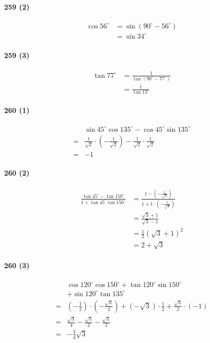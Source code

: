\documentclass[fleqn,a4j,dvipdfmx,uplatex,twocolumn]{jsarticle}
\begin{document}
\paragraph{259 (2)}
\begin{align*}
\cos 56^{\circ} & =\sin \left(90^{\circ}-56^{\circ}\right) \\
& =\sin 34^{\circ}
\end{align*}

\paragraph{259 (3)}
\begin{align*}
\tan 77^{\circ} & =\frac{1}{\tan \left(90^{\circ}-77^{\circ}\right)} \\
& =\frac{1}{\tan 13^{\circ}}
\end{align*}

\paragraph{260 (1)}
\begin{align*}
& \sin 45^{\circ} \cos 135^{\circ}-\cos 45^{\circ} \sin 135^{\circ} \\
= & \frac{1}{\sqrt{2}} \cdot\left(-\frac{1}{\sqrt{2}}\right)-\frac{1}{\sqrt{2}} \cdot \frac{1}{\sqrt{2}} \\
= & -1
\end{align*}

\paragraph{260 (2)}
\begin{align*}
\frac{\tan 45^{\circ}-\tan 150^{\circ}}{1+\tan 45^{\circ} \tan 150^{\circ}}
& =\frac{1-\left(-\frac{1}{\sqrt{3}}\right)}{1+1 \cdot\left(-\frac{1}{\sqrt{3}}\right)} \\
& =\frac{\sqrt{3}+1}{\sqrt{3}-1} \\
& =\frac{1}{2}(\sqrt{3}+1)^2 \\
& =2+\sqrt{3}
\end{align*}

\paragraph{260 (3)}
\begin{align*}
& \cos 120^{\circ} \cos 150^{\circ}+\tan 120^{\circ} \sin 150^{\circ} \\
& +\sin 120^{\circ} \tan 135^{\circ} \\
= & \left(-\frac{1}{2}\right) \cdot\left(-\frac{\sqrt{3}}{2}\right)+(-\sqrt{3}) \cdot \frac{1}{2}+\frac{\sqrt{3}}{2} \cdot(-1) \\
= & \frac{\sqrt{3}}{4}-\frac{\sqrt{3}}{2}-\frac{\sqrt{3}}{2} \\
= & -\frac{3}{4} \sqrt{3}
\end{align*}
\end{document}
